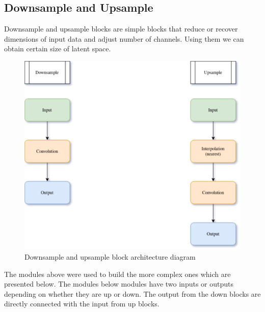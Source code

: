 \documentclass[11pt,a4paper]{report}
\begin{document}
\subsection{Downsample and Upsample}
Downsample and upsample blocks are simple blocks that reduce or recover dimensions of input data and adjust number of channels. Using them we can obtain certain size of latent space.
\begin{figure}[H]
	\centering
	\includegraphics[scale=0.6]{images/UpDownSample.drawio}
    \caption{Downsample and upsample block architecture diagram}
\end{figure}

The modules above were used to build the more complex ones which are presented below. The modules below modules have two inputs or outputs depending on whether they are up or down. The output from the down blocks are directly connected with the input from up blocks.
\end{document}
